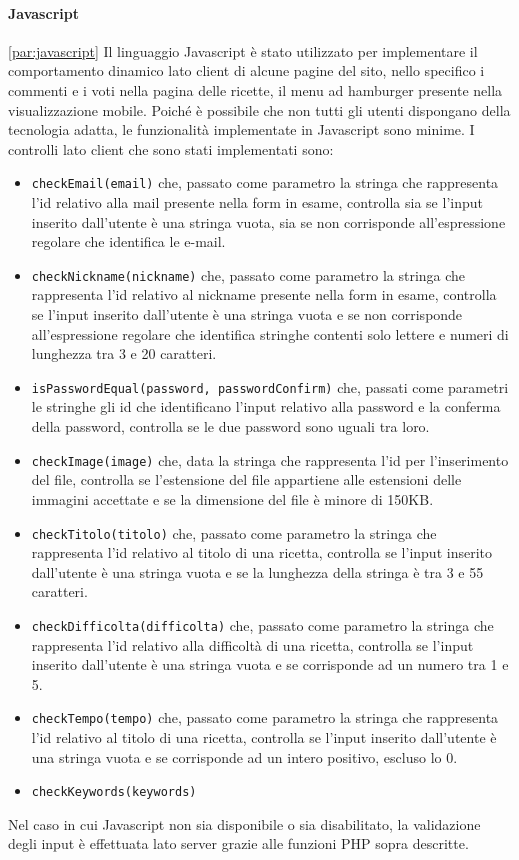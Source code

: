 \paragraph{Javascript}\ref{par:javascript}
Il linguaggio Javascript è stato utilizzato per implementare il comportamento dinamico lato client di alcune pagine del sito, nello specifico i commenti e i voti nella pagina delle ricette, il menu ad hamburger presente nella visualizzazione mobile.
Poiché è possibile che non tutti gli utenti dispongano della tecnologia adatta, le funzionalità implementate in Javascript sono minime. \newline
I controlli lato client che sono stati implementati sono: 
\begin{itemize}
	\item \texttt{checkEmail(email)} che, passato come parametro la stringa che rappresenta l'id relativo alla mail presente nella form in esame, controlla sia se l'input inserito dall'utente è una stringa vuota, sia se non corrisponde all'espressione regolare che identifica le e-mail.
	\item \texttt{checkNickname(nickname)} che, passato come parametro la stringa che rappresenta l'id relativo al nickname presente nella form in esame, controlla se l'input inserito dall'utente è una stringa vuota e se non corrisponde all'espressione regolare che identifica stringhe contenti solo lettere e numeri di lunghezza tra 3 e 20 caratteri.
	\item \texttt{isPasswordEqual(password, passwordConfirm)} che, passati come parametri le stringhe gli id che identificano l'input relativo alla password e la conferma della password, controlla se le due password sono uguali tra loro.
	\item \texttt{checkImage(image)} che, data la stringa che rappresenta l'id per l'inserimento del file, controlla se l'estensione del file appartiene alle estensioni delle immagini accettate e se la dimensione del file è minore di 150KB.
	\item \texttt{checkTitolo(titolo)} che, passato come parametro la stringa che rappresenta l'id relativo al titolo di una ricetta, controlla se l'input inserito dall'utente è una stringa vuota e se la lunghezza della stringa è tra 3 e 55 caratteri.
	\item \texttt{checkDifficolta(difficolta)} che, passato come parametro la stringa che rappresenta l'id relativo alla difficoltà di una ricetta, controlla se l'input inserito dall'utente è una stringa vuota e se corrisponde ad un numero tra 1 e 5.
	\item \texttt{checkTempo(tempo)} che, passato come parametro la stringa che rappresenta l'id relativo al titolo di una ricetta, controlla se l'input inserito dall'utente è una stringa vuota e se corrisponde ad un intero positivo, escluso lo 0.
	\item \texttt{checkKeywords(keywords)}
\end{itemize}
Nel caso in cui Javascript non sia disponibile o sia disabilitato, la validazione degli input è effettuata lato server grazie alle funzioni PHP sopra descritte.

